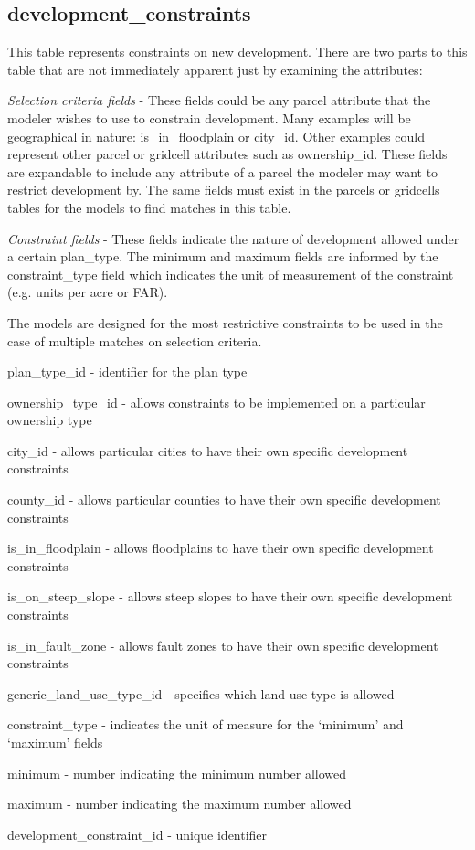 \subsection{development\_constraints} 

This table represents constraints on new development. There are two parts to this table that are not immediately apparent just by examining the attributes:

\emph{Selection criteria fields} - These fields could be any parcel attribute that the modeler wishes to use to constrain development. Many examples will be geographical in nature: is\_in\_floodplain or city\_id. Other examples could represent other parcel or gridcell attributes such as ownership\_id. These fields are expandable to include any attribute of a parcel the modeler may want to restrict development by. The same fields must exist in the parcels or gridcells tables for the models to find matches in this table.

\emph{Constraint fields} - These fields indicate the nature of development allowed under a certain plan\_type. The minimum and maximum fields are informed by the constraint\_type field which indicates the unit of measurement of the constraint (e.g. units per acre or FAR). 

The models are designed for the most restrictive constraints to be used in the case of multiple matches on selection criteria.

\begin{description}
\item plan\_type\_id - identifier for the plan type
\item ownership\_type\_id - allows constraints to be implemented on a particular ownership type
\item city\_id - allows particular cities to have their own specific development constraints
\item county\_id - allows particular counties to have their own specific development constraints
\item is\_in\_floodplain - allows floodplains to have their own specific development constraints
\item is\_on\_steep\_slope - allows steep slopes to have their own specific development constraints
\item is\_in\_fault\_zone - allows fault zones to have their own specific development constraints
\item generic\_land\_use\_type\_id - specifies which land use type is allowed
\item constraint\_type - indicates the unit of measure for the `minimum' and `maximum' fields
\item minimum - number indicating the minimum number allowed
\item maximum - number indicating the maximum number allowed 
\item development\_constraint\_id - unique identifier 
\end{description}

